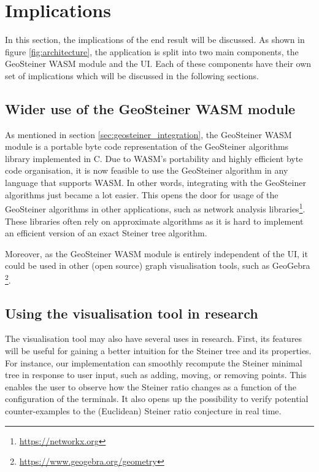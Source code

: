 \documentclass{l4proj}
\begin{document}



\section{Implications}
\label{sec:implications}
In this section, the implications of the end result will be discussed. As shown in figure \ref{fig:architecture}, the application is split into two main components, the GeoSteiner WASM module and the UI. Each of these components have their own set of implications which will be discussed in the following sections.
\subsection{Wider use of the GeoSteiner WASM module}

As mentioned in section \ref{sec:geosteiner_integration}, the GeoSteiner WASM module is a portable byte code representation of the GeoSteiner algorithms library implemented in C. Due to WASM's portability and highly efficient byte code organisation, it is now feasible to use the GeoSteiner algorithm in any language that supports WASM. In other words, integrating with the GeoSteiner algorithms just became a lot easier. This opens the door for usage of the GeoSteiner algorithms in other applications, such as network analysis libraries\footnote[5]{\url{https://networkx.org}}. These libraries often rely on approximate algorithms as it is hard to implement an efficient version of an exact Steiner tree algorithm.

Moreover, as the GeoSteiner WASM module is entirely independent of the UI, it could be used in other (open source) graph visualisation tools, such as GeoGebra \footnote[6]{\url{https://www.geogebra.org/geometry}}.
\subsection{Using the visualisation tool in research}
The visualisation tool may also have several uses in research. First, its features will be useful for gaining a better intuition for the Steiner tree and its properties. For instance, our implementation can smoothly recompute the Steiner minimal tree in response to user input, such as adding, moving, or removing points. This enables the user to observe how the Steiner ratio changes as a function of the configuration of the terminals. It also opens up the possibility to verify potential counter-examples to the (Euclidean) Steiner ratio conjecture in real time.
\end{document}
